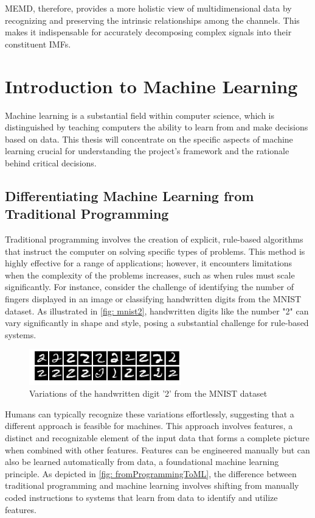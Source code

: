 MEMD, therefore, provides a more holistic view of multidimensional data by recognizing and preserving the intrinsic relationships among the channels. This makes it indispensable for accurately decomposing complex signals into their constituent IMFs.

\section{Introduction to Machine Learning}

Machine learning is a substantial field within computer science, which is distinguished by teaching computers the ability to learn from and make decisions based on data\cite{Mohammed2016}. This thesis will concentrate on the specific aspects of machine learning crucial for understanding the project's framework and the rationale behind critical decisions.

\subsection{Differentiating Machine Learning from Traditional Programming}

Traditional programming involves the creation of explicit, rule-based algorithms that instruct the computer on solving specific types of problems. This method is highly effective for a range of applications; however, it encounters limitations when the complexity of the problems increases, such as when rules must scale significantly\cite{Mohammed2016}. For instance, consider the challenge of identifying the number of fingers displayed in an image or classifying handwritten digits from the MNIST dataset\cite{deng2012mnist}. As illustrated in \autoref{fig: mnist2}, handwritten digits like the number "2" can vary significantly in shape and style, posing a substantial challenge for rule-based systems.

\begin{figure}
    \centering
    \includegraphics[width=250px]{Figures/MLintro/mnist2.png}
    \caption{Variations of the handwritten digit '2' from the MNIST dataset}
    \label{fig: mnist2}
\end{figure}

Humans can typically recognize these variations effortlessly, suggesting that a different approach is feasible for machines. This approach involves features, a distinct and recognizable element of the input data that forms a complete picture when combined with other features. Features can be engineered manually but can also be learned automatically from data, a foundational machine learning principle. As depicted in \autoref{fig: fromProgrammingToML}, the difference between traditional programming and machine learning involves shifting from manually coded instructions to systems that learn from data to identify and utilize features\cite{Mohammed2016}.

